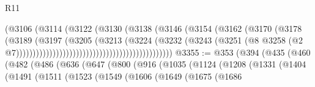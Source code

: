 \begin{lexlean}{R11}
\begin{coremodule}
                                                          (@3106
                                                            (@3114
                                                              (@3122
                                                                (@3130
                                                                  (@3138
                                                                    (@3146
                                                                      (@3154
                                                                        (@3162
                                                                          (@3170
                                                                            (@3178
                                                                              (@3189
                                                                                (@3197
                                                                                  (@3205
                                                                                    (@3213
                                                                                      (@3224
                                                                                        (@3232
                                                                                          (@3243
                                                                                            (@3251
                                                                                              (@8
                                                                                                @3258
                                                                                                (@2
                                                                                                  @7)))))))))))))))))))))))))))))))))))))))))))))))
@3355 := @353
    (@394
      (@435
        (@460
          (@482
            (@486
              (@636
                (@647
                  (@800
                    (@916
                      (@1035
                        (@1124
                          (@1208
                            (@1331
                              (@1404
                                (@1491
                                  (@1511
                                    (@1523
                                      (@1549
                                        (@1606
                                          (@1649
                                            (@1675
                                              (@1686

\end{coremodule}
\end{lexlean}
